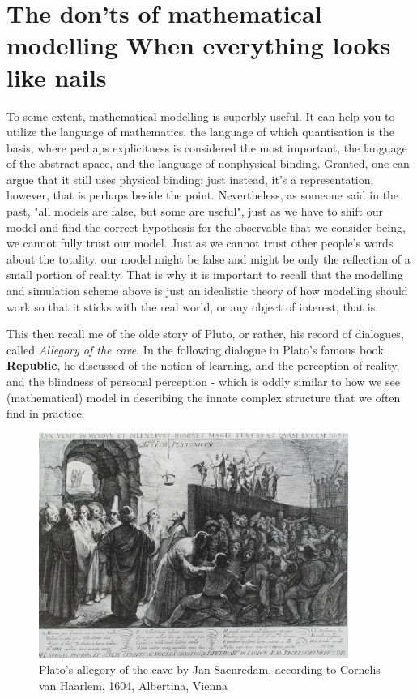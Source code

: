 \section[The don'ts of mathematical modelling]{The don'ts of mathematical modelling {\small When everything looks like nails}}
To some extent, mathematical modelling is superbly useful. It can help you to utilize the language of mathematics, the language of which quantisation is the basis, where perhaps explicitness is considered the most important, the language of the abstract space, and the language of nonphysical binding. Granted, one can argue that it still uses physical binding; just instead, it's a representation; however, that is perhaps beside the point. Nevertheless, as someone said in the past, "all models are false, but some are useful", just as we have to shift our model and find the correct hypothesis for the observable that we consider being, we cannot fully trust our model. Just as we cannot trust other people's words about the totality, our model might be false and might be only the reflection of a small portion of reality. That is why it is important to recall that the modelling and simulation scheme above is just an idealistic theory of how modelling should work so that it sticks with the real world, or any object of interest, that is. 

This then recall me of the olde story of Pluto, or rather, his record of dialogues, called \textit{Allegory of the cave}. In the following dialogue in Plato's famous book \textbf{Republic}, he discussed of the notion of learning, and the perception of reality, and the blindness of personal perception - which is oddly similar to how we see (mathematical) model in describing the innate complex structure that we often find in practice: 

\begin{figure}[h!]
    \centering
    \includegraphics[width=0.9\textwidth]{img/Platon_Cave_Sanraedam_1604.jpg}
    \caption{Plato's allegory of the cave by Jan Saenredam, according to Cornelis van Haarlem, 1604, Albertina, Vienna}
    \label{fig:PlatoAllegory}
\end{figure}

